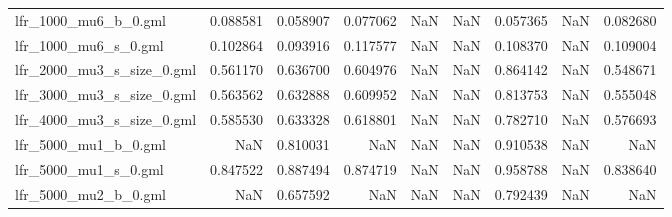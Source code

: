 \begin{tabular}{lrrrrrrrr}
lfr\_1000\_mu6\_b\_0.gml       &                            0.088581 &                       0.058907 &                          0.077062 &                           NaN &                             NaN &                     0.057365 &                                 NaN &                                0.082680 \\
lfr\_1000\_mu6\_s\_0.gml       &                            0.102864 &                       0.093916 &                          0.117577 &                           NaN &                             NaN &                     0.108370 &                                 NaN &                                0.109004 \\
lfr\_2000\_mu3\_s\_size\_0.gml  &                            0.561170 &                       0.636700 &                          0.604976 &                           NaN &                             NaN &                     0.864142 &                                 NaN &                                0.548671 \\
lfr\_3000\_mu3\_s\_size\_0.gml  &                            0.563562 &                       0.632888 &                          0.609952 &                           NaN &                             NaN &                     0.813753 &                                 NaN &                                0.555048 \\
lfr\_4000\_mu3\_s\_size\_0.gml  &                            0.585530 &                       0.633328 &                          0.618801 &                           NaN &                             NaN &                     0.782710 &                                 NaN &                                0.576693 \\
lfr\_5000\_mu1\_b\_0.gml       &                                 NaN &                       0.810031 &                               NaN &                           NaN &                             NaN &                     0.910538 &                                 NaN &                                     NaN \\
lfr\_5000\_mu1\_s\_0.gml       &                            0.847522 &                       0.887494 &                          0.874719 &                           NaN &                             NaN &                     0.958788 &                                 NaN &                                0.838640 \\
lfr\_5000\_mu2\_b\_0.gml       &                                 NaN &                       0.657592 &                               NaN &                           NaN &                             NaN &                     0.792439 &                                 NaN &                                     NaN \\

\end{tabular}

